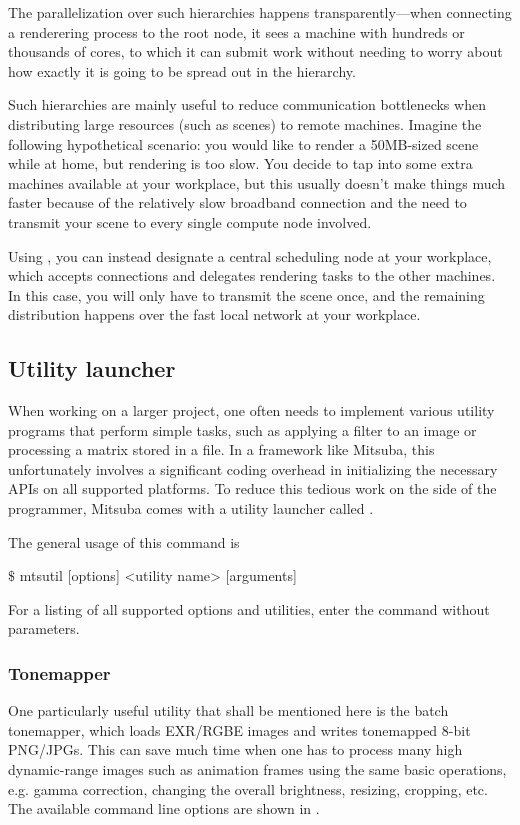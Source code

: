 The parallelization over such hierarchies happens transparently---when
connecting a renderering process to the root node, it sees a machine
with hundreds or thousands of cores, to which it can submit work without
needing to worry about how exactly it is going to be spread out in
the hierarchy.

Such hierarchies are mainly useful to reduce communication bottlenecks when distributing
large resources (such as scenes) to remote machines. Imagine the following hypothetical scenario:
you would like to render a 50MB-sized scene while at home, but rendering is too slow.
You decide to tap into some extra machines available
at your workplace, but this usually doesn't make things much faster because of the relatively slow broadband
connection and the need to transmit your scene to every single compute node involved.

Using , you can
instead designate a central scheduling node at your workplace, which accepts connections and delegates
rendering tasks to the other machines. In this case, you will only have to transmit the scene once,
and the remaining distribution happens over the fast local network at your workplace.
\subsection{Utility launcher}
\label{sec:mtsutil}
When working on a larger project, one often needs to implement various utility programs that
perform simple tasks, such as applying a filter to an image or processing
a matrix stored in a file. In a framework like Mitsuba, this unfortunately involves
a significant coding overhead in initializing the necessary APIs on all supported platforms.
To reduce this tedious work on the side of the programmer, Mitsuba comes with a utility launcher
called .

The general usage of this command is
\begin{shell}
$\texttt{\$}$ mtsutil [options] <utility name> [arguments]
\end{shell}
For a listing of all supported options and utilities, enter the command without parameters.

\subsubsection{Tonemapper}
\label{sec:tonemapper}
One particularly useful utility that shall be mentioned here is the batch tonemapper, which
loads EXR/RGBE images and writes tonemapped 8-bit PNG/JPGs. This can save much time when one has to
process many high dynamic-range images such as animation frames using the same basic operations,
e.g. gamma correction, changing the overall brightness, resizing, cropping, etc. The available
command line options are shown in .

